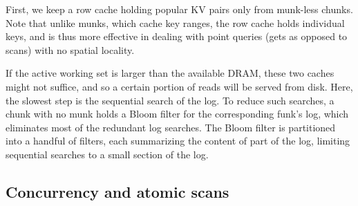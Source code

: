 \documentclass[sigplan,10pt]{acmart}
\newcommand{\code}[1]{\textsf{\fontsize{9}{11}\selectfont #1}}
\newcommand{\remove}[1]{}
\begin{document}
First, we keep a row cache holding popular KV pairs only from munk-less chunks. Note that unlike munks, which cache key ranges, the row
cache holds individual keys, and is thus more effective in dealing with point queries (gets as opposed to scans) with no
spatial locality.

If the active working set is larger than the available DRAM, these two caches might not suffice, and so a certain portion of reads 
will be served from disk. Here, the slowest step is the sequential search of the {log}. 
To reduce such searches, a chunk with no munk holds a Bloom filter for the corresponding funk's {log}, 
which eliminates most of the redundant log searches.
The Bloom filter is partitioned into a  handful of filters, each summarizing the 
content of part of the {log}, limiting  sequential  searches to a small section of the log.

 \subsection{Concurrency and atomic scans}
\label{ssec:scans}

\remove{
\paragraph{Chunk metadata structure.}

The metadata structure is given in Algorithm~\ref{alg:chunk}. 
The first field is its \code{state}, which is explained in \cref{ssec:rebalance}  below. 
It next holds a pointer to the appropriate funk, and either a munk or a Bloom filter, as well as a pointer to the next 
chunk in the chunk linked list.
\remove{
It further keeps the generation number of its latest munk, \code{gen}, and a per-generation sequence number,
\code{seq}, which, in case there is an active munk, is the index of the next free cell in the munk's  \code{karray}  and \code{varray}. The chunk's \code{gen} and \code{seq} are stored together in one 64-bit word to allow 
atomic access to both of them. 
}
Finally, the chunk includes locks to synchronize concurrent access by multiple threads, as explained below.

\begin{algorithm}[htb]

\begin{algorithmic}
\State \code{state} \Comment  baby, child, active, asleep, or aged
\State ptr \code{funk} \Comment funk disk address
\State ptr \code{munk} \Comment munk memory pointer
\State ptr \code{next} \Comment next chunk in linked list
\State ptr \code{bloomFilter} \Comment summary of set of keys in \code{log}
\State asymmetric lock \code{rebalanceLock} \Comment shared/exclusive lock 
\State lock \code{funkChangeLock} \Comment acquired with try\_lock 
\end{algorithmic}

\caption{Chunk metadata structure.}
\label{alg:chunk}
\end{algorithm}
}
\end{document}
